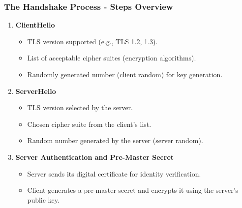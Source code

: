 \documentclass{beamer}
\begin{document}
\begin{frame}[fragile]
    \frametitle{The Handshake Process - Steps Overview}
    \begin{enumerate}
        \item \textbf{ClientHello}
        \begin{itemize}
            \item TLS version supported (e.g., TLS 1.2, 1.3).
            \item List of acceptable cipher suites (encryption algorithms).
            \item Randomly generated number (client random) for key generation.
        \end{itemize}
        
        \item \textbf{ServerHello}
        \begin{itemize}
            \item TLS version selected by the server.
            \item Chosen cipher suite from the client's list.
            \item Random number generated by the server (server random).
        \end{itemize}
        
        \item \textbf{Server Authentication and Pre-Master Secret}
        \begin{itemize}
            \item Server sends its digital certificate for identity verification.
            \item Client generates a pre-master secret and encrypts it using the server's public key.
        \end{itemize}
    \end{enumerate}
\end{frame}
\end{document}
